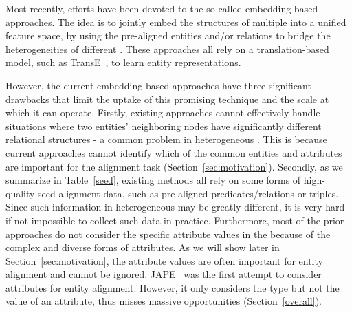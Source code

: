	Most recently, efforts have been devoted to the so-called \KG embedding-based approaches. The idea is to jointly embed the structures
of multiple \KGs into a unified feature space, by using the pre-aligned entities and/or relations to bridge the heterogeneities of different
\KGs. These approaches all rely on a translation-based model, such as TransE~\cite{bordes2013translating}, to learn entity representations.

However, the current \KG embedding-based approaches have three significant drawbacks that limit the uptake of this promising technique and
the scale at which it can operate. Firstly, existing approaches cannot effectively handle situations where two entities' neighboring nodes
have significantly different relational structures - a common problem in heterogeneous \KGs. This is because current approaches cannot
identify which of the common entities and attributes are important for the alignment task (Section~\ref{sec:motivation}). Secondly, as we
summarize in Table~\ref{seed}, existing methods all rely on some forms of high-quality seed alignment data, such as pre-aligned \KG
predicates/relations or triples. Since such information in heterogeneous \KGs may be greatly different, it is very hard if not impossible
to collect such data in practice. Furthermore, most of the prior approaches do not consider the specific attribute values in the \KGs
because of the complex and diverse forms of attributes. As we will show later in Section~\ref{sec:motivation}, the attribute values are
often important for entity alignment and cannot be ignored. JAPE~\cite{sun2017cross} was the first attempt to consider attributes for
entity alignment. However, it only considers the type but not the value of an attribute, thus misses massive opportunities
(Section~\ref{overall}).


